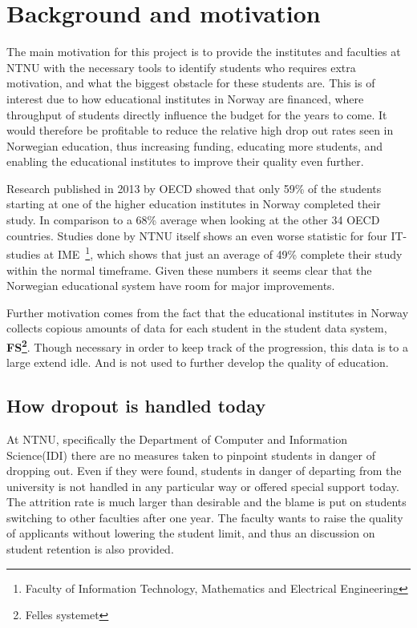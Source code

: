 \section{Background and motivation}
	The main motivation for this project is to provide the institutes and faculties at NTNU 
	with the necessary tools to identify students who requires extra motivation, and what the biggest obstacle for these students are.
	This is of interest due to how educational institutes in Norway are financed, 
	where throughput of students directly influence the budget for the years to come\cite{finansiering}. 
	It would therefore be profitable to reduce the relative high drop out rates seen in Norwegian education, 
	thus increasing funding, educating more students, and enabling the educational institutes to improve their quality even further.
	
	\bigskip\noindent
	Research published in 2013 by OECD showed that only 59\% of the students
	starting at one of the higher education institutes in Norway completed their study.
	In comparison to a 68\% average when looking at the other 34 OECD countries\cite{OECD2013}.
	Studies done by NTNU itself shows an even worse statistic for four IT-studies at IME~\footnote{Faculty of Information Technology, Mathematics and Electrical Engineering},	which shows that just an average of 49\%\cite{ntnu:dropout} complete their study within the normal timeframe.
	Given these numbers it seems clear that the Norwegian educational system have room for major improvements. 

	\bigskip\noindent
	Further motivation comes from the fact that the educational institutes in Norway collects
	copious amounts of data for each student in the student data system, \textbf{FS\footnote{Felles systemet}}. 
	Though necessary in order to keep track of the progression, 
	this data is to a large extend idle. And is not used to further develop the quality of education. 
	
\subsection{How dropout is handled today}
At NTNU, specifically the Department of Computer and Information Science(IDI) there are no measures taken to pinpoint students in danger of dropping out.
Even if they were found, students in danger of departing from the university is not handled in any particular way or offered special support today.
The attrition rate is much larger than desirable and the blame is put on students switching to other faculties after one year.
The faculty wants to raise the quality of applicants without lowering the student limit, and thus an discussion on student retention is also provided. 
